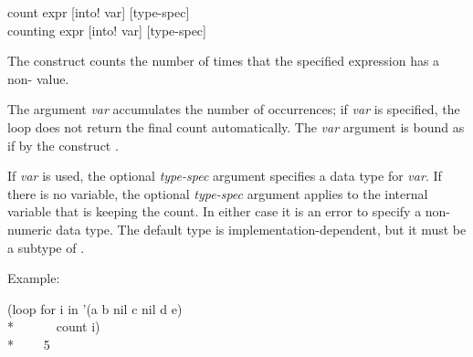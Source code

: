 \begin{defloop}
count expr [\!into! var] [type-spec] \\
counting expr [\!into! var] [type-spec]

The  construct counts the number of times that the specified 
expression has a non- value.

The argument \emph{var\/} accumulates the number of occurrences; if 
\emph{var} is specified, the loop
does not return the final count automatically.  The \emph{var\/} argument
is bound as if by the construct .

If  \emph{var\/} is used, the optional
\emph{type-spec\/} argument specifies a data type for \emph{var\/}.
If there is no  variable, the optional \emph{type-spec\/}
argument applies to the internal variable that is keeping the count.
In either case it is an error to specify a non-numeric 
data type.
The default type is implementation-dependent, but it must be a subtype
of .

Example:
\begin{lisp}
(loop for i in '(a b nil c nil d e) \\*
~~~~~~count i) \\*
~~~\EV~5
\end{lisp}
\end{defloop}


